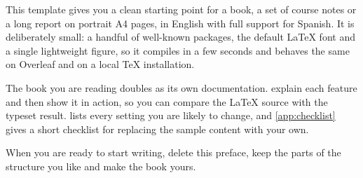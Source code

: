 
This template gives you a clean starting point for a book, a set of course
notes or a long report on portrait A4 pages, in English with full support
for Spanish. It is deliberately small: a handful of well-known packages, the
default \LaTeX{} font and a single lightweight figure, so it compiles in a few seconds and behaves the same on Overleaf and
on a local \TeX{} installation.

The book you are reading doubles as its own documentation. 
explain each feature and then show it in action, so you can compare the
\LaTeX{} source with the typeset result. 
lists every setting you are likely to change, and \cref{app:checklist}
gives a short checklist for replacing the sample content with your own.

When you are ready to start writing, delete this preface, keep the parts of
the structure you like and make the book yours.
